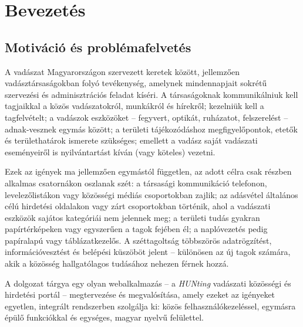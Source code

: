 
\chapter{Bevezetés}
\label{chap:bevezetes}

\section{Motiváció és problémafelvetés}
\label{sec:bev-motivacio}

A vadászat Magyarországon szervezett keretek között, jellemzően vadásztársaságokban folyó
tevékenység, amelynek mindennapjait sokrétű szervezési és adminisztrációs feladat kíséri. A
társaságoknak kommunikálniuk kell tagjaikkal a közös vadászatokról, munkákról és hírekről;
kezelniük kell a tagfelvételt; a vadászok eszközöket -- fegyvert, optikát, ruházatot,
felszerelést -- adnak-vesznek egymás között; a területi tájékozódáshoz megfigyelőpontok, etetők
és területhatárok ismerete szükséges; emellett a vadász saját vadászati eseményeiről is
nyilvántartást kíván (vagy köteles) vezetni.

Ezek az igények ma jellemzően egymástól független, az adott célra csak részben alkalmas
csatornákon oszlanak szét: a társasági kommunikáció telefonon, levelezőlistákon vagy közösségi
médiás csoportokban zajlik; az adásvétel általános célú hirdetési oldalakon vagy zárt
csoportokban történik, ahol a vadászati eszközök sajátos kategóriái nem jelennek meg; a területi
tudás gyakran papírtérképeken vagy egyszerűen a tagok fejében él; a naplóvezetés pedig
papíralapú vagy táblázatkezelős. A széttagoltság többszörös adatrögzítést, információvesztést
és belépési küszöböt jelent -- különösen az új tagok számára, akik a közösség hallgatólagos
tudásához nehezen férnek hozzá.

A dolgozat tárgya egy olyan webalkalmazás -- a \emph{HUNting} vadászati közösségi és hirdetési
portál -- megtervezése és megvalósítása, amely ezeket az igényeket egyetlen, integrált
rendszerben szolgálja ki: közös felhasználókezeléssel, egymásra épülő funkciókkal és egységes,
magyar nyelvű felülettel.

